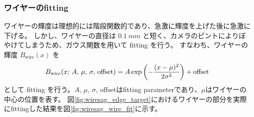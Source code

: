 \documentclass[../../main.tex]{subfiles}
\begin{document}
\subsubsection{ワイヤーのfitting}
ワイヤーの輝度は理想的には階段関数的であり、急激に輝度を上げた後に急激に下げる。
しかし、ワイヤーの直径は $\SI{0.1}{mm}$ と短く、カメラのピントによりぼやけてしまうため、ガウス関数を用いて fitting を行う。
すなわち、ワイヤーの輝度 $B_{\mathrm{wire}}(x)$ を
\begin{align}
    B_{\mathrm{wire}}(x;\,A,\,\mu,\,\sigma,\,\text{offset}) = A\exp\qty(-\dfrac{(x-\mu)^2}{2\sigma^2}) + \mathrm{offset}
\end{align}
として fitting を行う。$A,\,\mu,\,\sigma,\,\text{offset}$はfitting parameterであり、$\mu$はワイヤーの中心の位置を表す。
図\ref{fig:wiresag_edge_target}におけるワイヤーの部分を実際にfittingした結果を図\ref{fig:wiresag_wire_fit}に示す。
\end{document}
